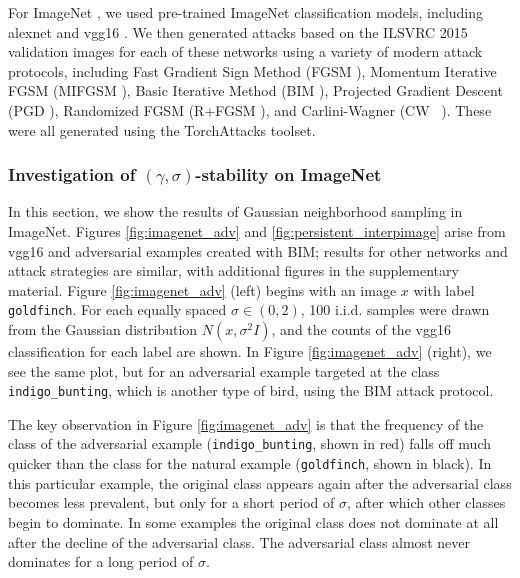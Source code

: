 For ImageNet \citep{Imagenet-old}, we used pre-trained ImageNet classification models, including alexnet \cite{alexnet} and vgg16 \cite{simonyan2014very}.
We then generated attacks based on the ILSVRC 2015 \citep{ILSVRC15} validation images for each of these networks using a variety of modern attack protocols, including Fast Gradient Sign Method (FGSM \citep{goodfellow_explaining_2014}), Momentum Iterative FGSM (MIFGSM \citep{dongMIFGSM}), Basic Iterative Method (BIM \citep{kurakin_adversarial_2016}), Projected Gradient Descent (PGD \citep{madry_towards_2017}), Randomized FGSM (R+FGSM \citep{tramer2018ensemble}), and Carlini-Wagner (CW ~\cite{carlini_towards_2016}). These were all generated using the TorchAttacks \cite{kim2021torchattacks} toolset.

\subsubsection{Investigation of $(\gamma, \sigma)$-stability on ImageNet}

In this section, we show the results of Gaussian neighborhood sampling in ImageNet. Figures \ref{fig:imagenet_adv} and \ref{fig:persistent_interpimage} arise from vgg16 and adversarial examples created with BIM; results for other networks and attack strategies are similar, with additional figures in the supplementary material. Figure \ref{fig:imagenet_adv} (left) begins with an image $x$ with label \texttt{goldfinch}. For each equally spaced $\sigma\in(0,2)$, 100 i.i.d. samples were drawn from the Gaussian distribution $N(x,\sigma^2I)$, and the counts of the vgg16 classification for each label are shown. In Figure \ref{fig:imagenet_adv} (right), we see the same plot, but for an adversarial example targeted at the class \texttt{indigo\_bunting}, which is another type of bird, using the BIM attack protocol. %

The key observation in Figure \ref{fig:imagenet_adv} is that the frequency of the class of the adversarial example (\texttt{indigo\_bunting}, shown in red) falls off much quicker than the class for the natural example (\texttt{goldfinch}, shown in black). In this particular example, the original class appears again after the adversarial class becomes less prevalent, but only for a short period of $\sigma$, after which other classes begin to dominate. In some examples the original class does not dominate at all after the decline of the adversarial class. The adversarial class almost never dominates for a long period of $\sigma$. 


